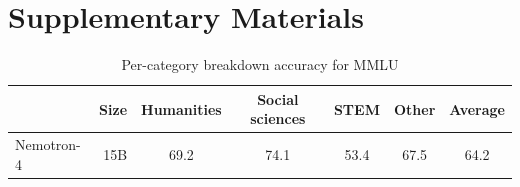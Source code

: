 \documentclass[11pt]{article}
\newcommand{\ours}{Nemotron-4}
\begin{document}










\FloatBarrier

\appendix

\section*{Supplementary Materials} \label{supplementary_material}

\begin{table}[H]
\centering
\begin{tabular}{lrccccc} 
\toprule
    & Size & Humanities & Social sciences & STEM & Other & Average       \\ 
\midrule
\ours{} & 15B & 69.2 & 74.1 & 53.4 & 67.5 & 64.2 \\ 
\bottomrule
\end{tabular}
\caption{\label{tab:mmlu} Per-category breakdown accuracy for MMLU }
\end{table}
\end{document}
